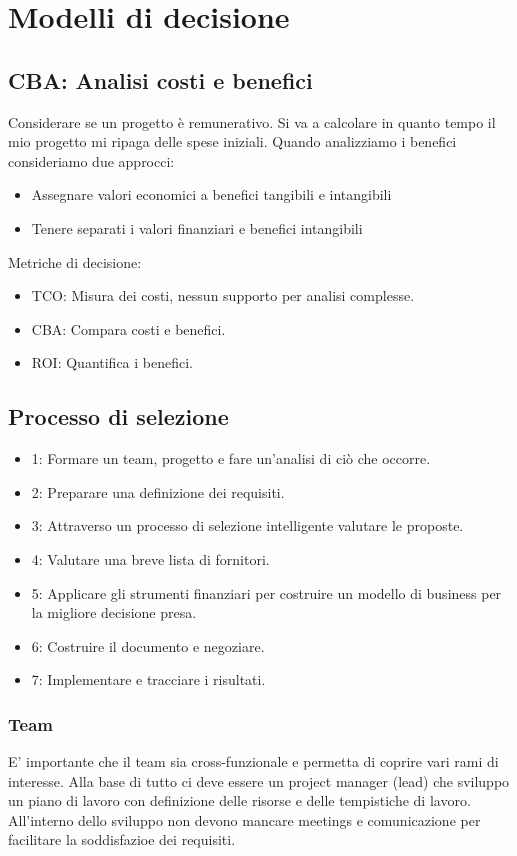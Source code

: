 \documentclass{article}
\begin{document}
		\newpage	
		\section{Modelli di decisione}
		\subsection{CBA: Analisi costi e benefici}
		Considerare se un progetto è remunerativo. Si va a calcolare in quanto tempo il mio progetto mi ripaga delle spese iniziali. Quando analizziamo i benefici consideriamo due approcci:
		\begin{itemize}
		    \item Assegnare valori economici a benefici tangibili e intangibili
		    \item Tenere separati i valori finanziari e benefici intangibili
		\end{itemize}
		Metriche di decisione:
		\begin{itemize}
		    \item TCO: Misura dei costi, nessun supporto per analisi complesse.
		    \item CBA: Compara costi e benefici.
		    \item ROI: Quantifica i benefici.
		\end{itemize}
		\subsection{Processo di selezione}
		\begin{itemize}
		    \item 1: Formare un team, progetto e fare un'analisi di ciò che occorre.
		    \item 2: Preparare una definizione dei requisiti.
		    \item 3: Attraverso un processo di selezione intelligente valutare le proposte.
		    \item 4: Valutare una breve lista di fornitori.
		    \item 5: Applicare gli strumenti finanziari per costruire un modello di business per la migliore decisione presa.
		    \item 6: Costruire il documento e negoziare.
		    \item 7: Implementare e tracciare i risultati.
		\end{itemize}
		\subsubsection{Team}
		E' importante che il team sia cross-funzionale e permetta di coprire vari rami di interesse. Alla base di tutto ci deve essere un project manager (lead) che sviluppo un piano di lavoro con definizione delle risorse e delle tempistiche di lavoro. \\
		All'interno dello sviluppo non devono mancare meetings e comunicazione per facilitare la soddisfazioe dei requisiti.
\end{document}
